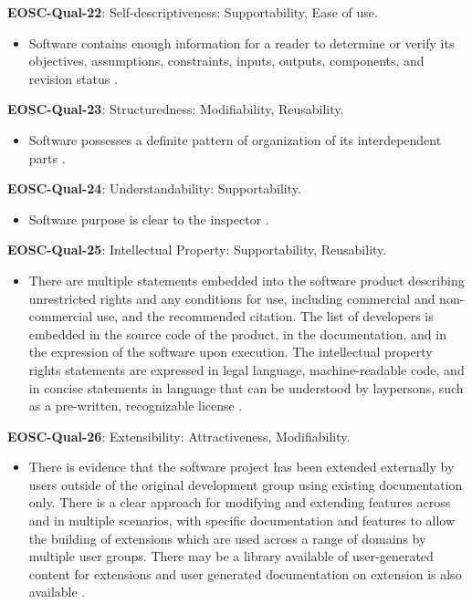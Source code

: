 \textbf{EOSC-Qual-22}: Self-descriptiveness: Supportability, Ease of use.

\begin{itemize}
    \item Software contains enough information for a reader to determine or verify its objectives, assumptions, constraints, inputs, outputs, components, and revision status \cite{boehm_quantitative_1976}.
\end{itemize}

\textbf{EOSC-Qual-23}: Structuredness: Modifiability, Reusability.

\begin{itemize}
    \item Software possesses a definite pattern of organization of its interdependent parts \cite{boehm_quantitative_1976}.
\end{itemize}

\textbf{EOSC-Qual-24}: Understandability: Supportability.

\begin{itemize}
    \item Software purpose is clear to the inspector \cite{boehm_quantitative_1976}.
\end{itemize}

\textbf{EOSC-Qual-25}: Intellectual Property: Supportability, Reusability.

\begin{itemize}
    \item There are multiple statements embedded into the software product describing unrestricted rights and any conditions for use, including commercial and non-commercial use, and the recommended citation. The list of developers is embedded in the source code of the product, in the documentation, and in the expression of the software upon execution. The intellectual property rights statements are expressed in legal language, machine-readable code, and in concise statements in language that can be understood by laypersons, such as a pre-written, recognizable license \cite{shepherdson_cessda_2019}.
\end{itemize}

\textbf{EOSC-Qual-26}: Extensibility: Attractiveness, Modifiability.

\begin{itemize}
    \item There is evidence that the software project has been extended externally by users outside of the original development group using existing documentation only. There is a clear approach for modifying and extending features across and in multiple scenarios, with specific documentation and features to allow the building of extensions which are used across a range of domains by multiple user groups. There may be a library available of user-generated content for extensions and user generated documentation on extension is also available \cite{shepherdson_cessda_2019}.
\end{itemize}

